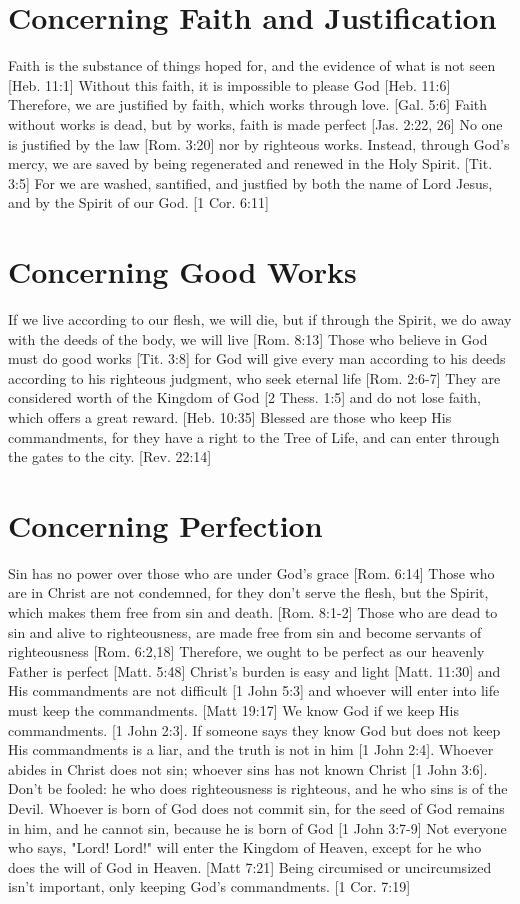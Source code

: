 \documentclass[../main.tex]{subfiles}
\begin{document}
	\section{Concerning Faith and Justification}

	Faith is the substance of things hoped for, and the evidence of what is not seen [Heb. 11:1] Without this faith, it is impossible to please God [Heb. 11:6] Therefore, we are justified by faith, which works through love. [Gal. 5:6] Faith without works is dead, but by works, faith is made perfect [Jas. 2:22, 26] No one is justified by the law [Rom. 3:20] nor by righteous works. Instead, through God's mercy, we are saved by being regenerated and renewed in the Holy Spirit. [Tit. 3:5] For we are washed, santified, and justfied by both the name of Lord Jesus, and by the Spirit of our God. [1 Cor. 6:11]

	\section{Concerning Good Works}

	If we live according to our flesh, we will die, but if through the Spirit, we do away with the deeds of the body, we will live [Rom. 8:13] Those who believe in God must do good works [Tit. 3:8] for God will give every man according to his deeds according to his righteous judgment, who seek eternal life [Rom. 2:6-7] They are considered worth of the Kingdom of God [2 Thess. 1:5] and do not lose faith, which offers a great reward. [Heb. 10:35] Blessed are those who keep His commandments, for they have a right to the Tree of Life, and can enter through the gates to the city. [Rev. 22:14]

	\section{Concerning Perfection}

	Sin has no power over those who are under God's grace [Rom. 6:14] Those who are in Christ are not condemned, for they don't serve the flesh, but the Spirit, which makes them free from sin and death. [Rom. 8:1-2] Those who are dead to sin and alive to righteousness, are made free from sin and become servants of righteousness [Rom. 6:2,18] Therefore, we ought to be perfect as our heavenly Father is perfect [Matt. 5:48] Christ's burden is easy and light [Matt. 11:30] and His commandments are not difficult [1 John 5:3] and whoever will enter into life must keep the commandments. [Matt 19:17] We know God if we keep His commandments. [1 John 2:3]. If someone says they know God but does not keep His commandments is a liar, and the truth is not in him [1 John 2:4]. Whoever abides in Christ does not sin; whoever sins has not known Christ [1 John 3:6]. Don't be fooled: he who does righteousness is righteous, and he who sins is of the Devil. Whoever is born of God does not commit sin, for the seed of God remains in him, and he cannot sin, because he is born of God [1 John 3:7-9] Not everyone who says, "Lord! Lord!" will enter the Kingdom of Heaven, except for he who does the will of God in Heaven. [Matt 7:21] Being circumised or uncircumsized isn't important, only keeping God's commandments. [1 Cor. 7:19]
\end{document}

